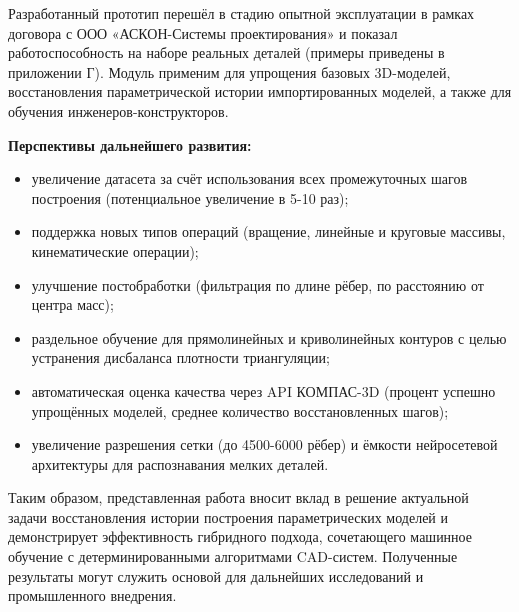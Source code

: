 Разработанный прототип перешёл в стадию опытной эксплуатации в рамках договора с ООО «АСКОН-Системы проектирования» и показал работоспособность на наборе реальных деталей (примеры приведены в приложении Г). Модуль применим для упрощения базовых 3D-моделей, восстановления параметрической истории импортированных моделей, а также для обучения инженеров-конструкторов.

\textbf{Перспективы дальнейшего развития:}
\begin{itemize}
    \item увеличение датасета за счёт использования всех промежуточных шагов построения (потенциальное увеличение в 5-10 раз);
    \item поддержка новых типов операций (вращение, линейные и круговые массивы, кинематические операции);
    \item улучшение постобработки (фильтрация по длине рёбер, по расстоянию от центра масс);
    \item раздельное обучение для прямолинейных и криволинейных контуров с целью устранения дисбаланса плотности триангуляции;
    \item автоматическая оценка качества через API КОМПАС-3D (процент успешно упрощённых моделей, среднее количество восстановленных шагов);
    \item увеличение разрешения сетки (до 4500-6000 рёбер) и ёмкости нейросетевой архитектуры для распознавания мелких деталей.
\end{itemize}

Таким образом, представленная работа вносит вклад в решение актуальной задачи восстановления истории построения параметрических моделей и демонстрирует эффективность гибридного подхода, сочетающего машинное обучение с детерминированными алгоритмами CAD-систем. Полученные результаты могут служить основой для дальнейших исследований и промышленного внедрения.

